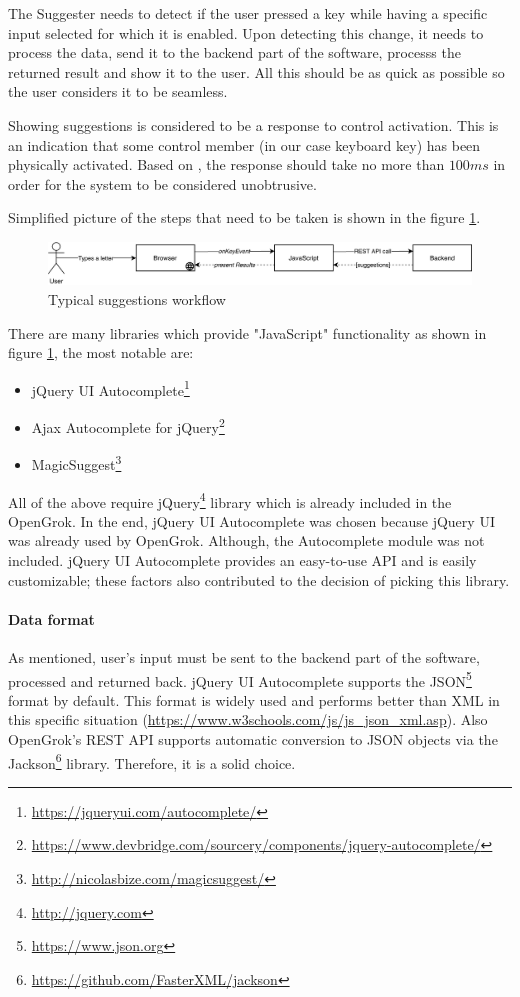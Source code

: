 The Suggester needs to detect if the user pressed a key while having a specific input selected for which it is enabled. Upon
detecting this change, it needs to process the data, send it to the backend part of the software, processs the returned
result and show it to
the user. All this should be as quick as possible so the user considers it to be seamless.

Showing suggestions is considered to be a response to control activation. This is an indication that some control member
(in our case keyboard key) has been physically activated. Based on \citep{response_time}, the response
should take no more than $100ms$ in order for the system to be considered unobtrusive.

Simplified picture of the
steps that need to be taken is shown in the figure \ref{suggest_sequence}.

\begin{figure}[htbp]
\centering
\includegraphics[width=145mm]{../img/opengrok_sequence.pdf}
\caption{Typical suggestions workflow}
\label{suggest_sequence}
\end{figure}

There are many libraries which provide "JavaScript" functionality as shown in figure \ref{suggest_sequence},
the most notable are:
\begin{itemize}
    \item jQuery UI Autocomplete\footnote{\url{https://jqueryui.com/autocomplete/}}
    \item Ajax Autocomplete for jQuery\footnote{\url{https://www.devbridge.com/sourcery/components/jquery-autocomplete/}}
    \item MagicSuggest\footnote{\url{http://nicolasbize.com/magicsuggest/}}
\end{itemize}

All of the above require jQuery\footnote{\url{http://jquery.com}} library which is already included in the OpenGrok.
In the end, jQuery UI Autocomplete was chosen because jQuery UI was already used by OpenGrok. Although, the Autocomplete
module was not included. jQuery UI Autocomplete provides an easy-to-use API and is easily customizable; these factors
also contributed to the decision of picking this library.

\paragraph{Data format}
As mentioned, user's input must be sent to the backend part of the software, processed and
returned back. jQuery UI Autocomplete supports the JSON\footnote{\url{https://www.json.org}} format by default. This format
is widely used and performs better than XML in this
specific situation (\url{https://www.w3schools.com/js/js_json_xml.asp}). Also OpenGrok's REST API supports
automatic conversion to JSON objects via the Jackson\footnote{\url{https://github.com/FasterXML/jackson}} library.
Therefore, it is a solid choice.

